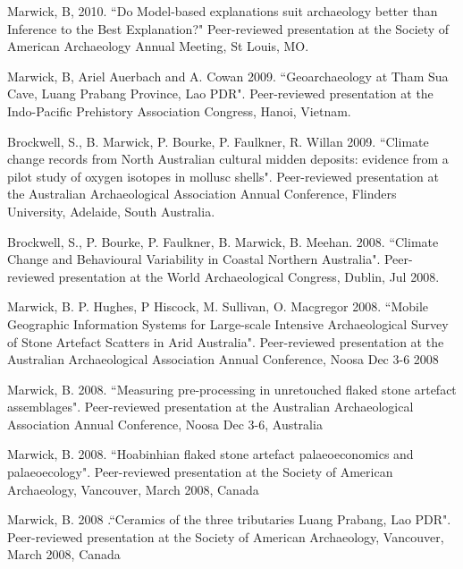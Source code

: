 \documentclass[11pt,article,oneside]{memoir}
\begin{document}
\ind Marwick, B, 2010. ``Do Model-based explanations suit archaeology better than Inference to the Best Explanation?" Peer-reviewed presentation at the Society of American Archaeology Annual Meeting, St Louis, MO.

\ind Marwick, B, Ariel Auerbach and A. Cowan 2009. ``Geoarchaeology at Tham Sua Cave, Luang Prabang Province, Lao PDR". Peer-reviewed presentation at the Indo-Pacific Prehistory Association Congress, Hanoi, Vietnam.

\ind Brockwell, S., B. Marwick, P. Bourke, P. Faulkner, R. Willan 2009. ``Climate change records from North Australian cultural midden deposits: evidence from a pilot study of oxygen isotopes in mollusc shells". Peer-reviewed presentation  at the Australian Archaeological Association Annual Conference, Flinders University, Adelaide, South Australia.

\ind Brockwell, S., P. Bourke, P. Faulkner, B. Marwick, B. Meehan. 2008. ``Climate Change and Behavioural Variability in Coastal Northern Australia". Peer-reviewed presentation at the World Archaeological Congress, Dublin,  Jul 2008. 

\ind Marwick, B. P. Hughes, P Hiscock, M. Sullivan, O. Macgregor 2008. ``Mobile Geographic Information Systems for Large-scale Intensive Archaeological Survey of Stone Artefact Scatters in Arid Australia". Peer-reviewed presentation at the Australian Archaeological Association Annual Conference, Noosa Dec 3-6 2008

\ind Marwick, B. 2008. ``Measuring pre-processing in unretouched flaked stone artefact assemblages". Peer-reviewed presentation at the Australian Archaeological Association Annual Conference, Noosa Dec 3-6, Australia

\ind Marwick, B. 2008. ``Hoabinhian flaked stone artefact palaeoeconomics and palaeoecology". Peer-reviewed presentation at the Society of American Archaeology, Vancouver, March 2008, Canada

\ind Marwick, B. 2008 .``Ceramics of the three tributaries Luang Prabang, Lao PDR". Peer-reviewed presentation at the  Society of American Archaeology, Vancouver, March 2008, Canada

 \bigskip
 
 
\end{document}
